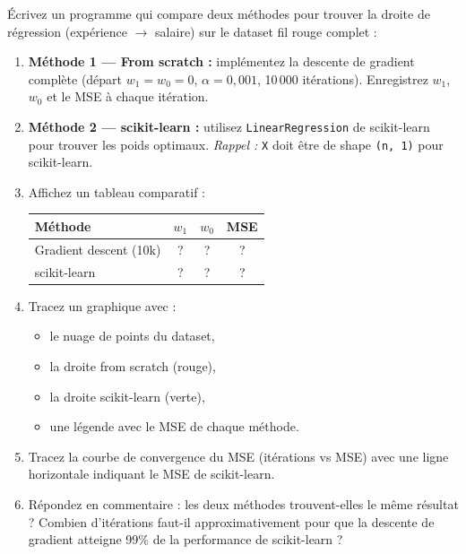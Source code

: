 \'{E}crivez un programme qui compare deux m\'{e}thodes pour trouver la droite de
r\'{e}gression (exp\'{e}rience $\to$ salaire) sur le dataset fil rouge complet :

\begin{enumerate}[label=\alph*)]
    \item \textbf{M\'{e}thode 1 --- From scratch :} impl\'{e}mentez la descente de gradient
        compl\`{e}te (d\'{e}part $w_1 = w_0 = 0$, $\alpha = 0{,}001$, 10\,000 it\'{e}rations).
        Enregistrez $w_1$, $w_0$ et le MSE \`{a} chaque it\'{e}ration.

    \item \textbf{M\'{e}thode 2 --- scikit-learn :} utilisez
        \texttt{LinearRegression} de scikit-learn pour trouver les poids optimaux.
        \emph{Rappel :} \texttt{X} doit \^{e}tre de shape \texttt{(n, 1)} pour scikit-learn.

    \item Affichez un tableau comparatif :

    \begin{center}
    \renewcommand{\arraystretch}{1.2}
    \begin{tabular}{l|c|c|c}
        \toprule
        \textbf{M\'{e}thode} & $w_1$ & $w_0$ & MSE \\
        \midrule
        Gradient descent (10k) & ? & ? & ? \\
        scikit-learn & ? & ? & ? \\
        \bottomrule
    \end{tabular}
    \end{center}

    \item Tracez un graphique avec :
    \begin{itemize}
        \item le nuage de points du dataset,
        \item la droite from scratch (rouge),
        \item la droite scikit-learn (verte),
        \item une l\'{e}gende avec le MSE de chaque m\'{e}thode.
    \end{itemize}

    \item Tracez la courbe de convergence du MSE (it\'{e}rations vs MSE)
        avec une ligne horizontale indiquant le MSE de scikit-learn.

    \item R\'{e}pondez en commentaire :
        les deux m\'{e}thodes trouvent-elles le m\^{e}me r\'{e}sultat ?
        Combien d'it\'{e}rations faut-il approximativement pour que la descente
        de gradient atteigne 99\% de la performance de scikit-learn ?
\end{enumerate}

